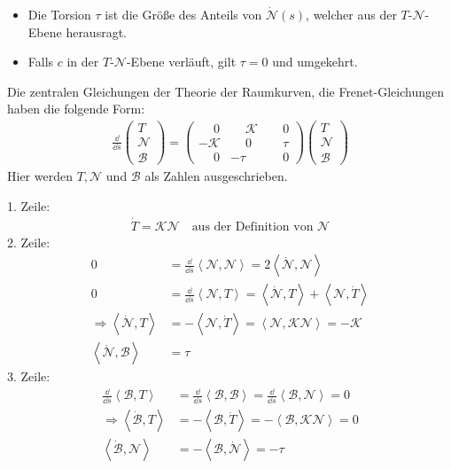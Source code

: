 	\begin{itemize}
		\item Die Torsion $\tau$ ist die Größe des Anteils von $\dot{\mathcal{N}}(s)$, welcher aus der $T$-$\mathcal{N}$-Ebene herausragt.
		\item Falls $c$ in der $T$-$\mathcal{N}$-Ebene verläuft, gilt $\tau = 0$ und umgekehrt. 
	\end{itemize}
\begin{satz}
Die zentralen Gleichungen der Theorie der Raumkurven, die Frenet-Gleichungen haben die folgende Form: 
\begin{align}
	\frac{\dd}{\dd s}\begin{pmatrix} T \\ \mathcal{N} \\ \mathcal{B}\end{pmatrix} = 
	\begin{pmatrix}	
	\phantom{-}0 & \phantom{-}\mathcal{K} & \phantom{-}0 \\
	-\mathcal{K} & \phantom{-}0 & \phantom{-}\tau \\
	\phantom{-}0 & -\tau & \phantom{-}0
	\end{pmatrix}
	\begin{pmatrix} T \\ \mathcal{N} \\ \mathcal{B}\end{pmatrix}
\end{align}
Hier werden $T, \mathcal{N}$ und $\mathcal{B}$ als Zahlen ausgeschrieben.
\end{satz}
\begin{bew}
1. Zeile:
\begin{align*}
\dot{T} = \mathcal{K}\mathcal{N} \quad \text{aus der Definition von $\mathcal{N}$}  	
\end{align*}
2. Zeile: 
\begin{align*}
	0 &= \frac{\dd}{\dd s}\left<\mathcal{N},\mathcal{N}\right> = 2\left<\mathcal{\dot{N}},\mathcal{N}\right>\\
	0 &= \frac{\dd}{\dd s}\left<\mathcal{N},T\right> = \left<\mathcal{\dot{N}},T\right> +\left<\mathcal{N},\dot{T}\right>	\\
	\Rightarrow \left<\mathcal{\dot{N}},T\right> &= -\left<\mathcal{N},\dot{T}\right> = \left<\mathcal{N},\mathcal{K}\mathcal{N}\right> = -\mathcal{K} \\
	\left<\mathcal{\dot{N}},\mathcal{B}\right> &= \tau
\end{align*}
3. Zeile:
\begin{align*}
	\frac{\dd}{\dd s}\left<\mathcal{B},T\right> &= \frac{\dd}{\dd s}\left<\mathcal{B},\mathcal{B}\right> = \frac{\dd}{\dd s}\left<\mathcal{B},\mathcal{N}\right> = 0 \\
	\Rightarrow \left<\mathcal{\dot{B}},T\right> &= -\left<\mathcal{B},\dot{T}\right> = -\left<\mathcal{B},\mathcal{K}\mathcal{N}\right> = 0 \\
	\left<\mathcal{\dot{B}},\mathcal{N}\right> &= - \left<\mathcal{B},\mathcal{\dot{N}}\right> = -\tau
\end{align*}
\end{bew}
